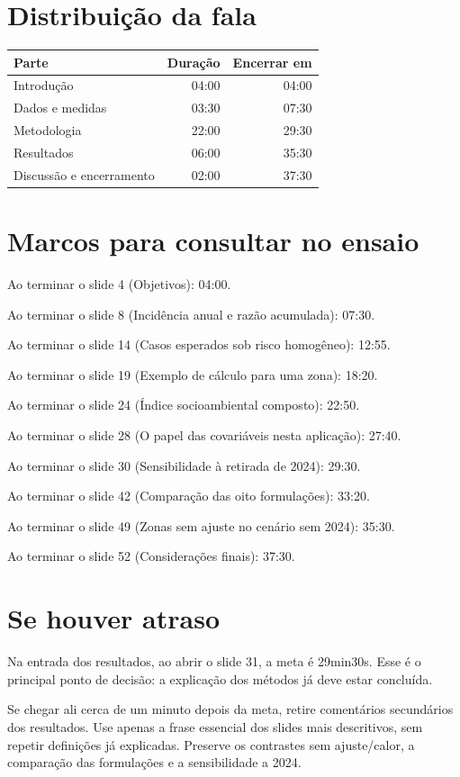 \documentclass[11pt,a4paper]{article}
\begin{document}
\section*{Distribuição da fala}\begin{tabular}{@{}lrr@{}}\toprule Parte & Duração & Encerrar em\\\midrule
Introdução & 04:00 & 04:00\\
Dados e medidas & 03:30 & 07:30\\
Metodologia & 22:00 & 29:30\\
Resultados & 06:00 & 35:30\\
Discussão e encerramento & 02:00 & 37:30\\
\bottomrule\end{tabular}
\section*{Marcos para consultar no ensaio}
Ao terminar o slide 4 (Objetivos): 04:00.\par
Ao terminar o slide 8 (Incidência anual e razão acumulada): 07:30.\par
Ao terminar o slide 14 (Casos esperados sob risco homogêneo): 12:55.\par
Ao terminar o slide 19 (Exemplo de cálculo para uma zona): 18:20.\par
Ao terminar o slide 24 (Índice socioambiental composto): 22:50.\par
Ao terminar o slide 28 (O papel das covariáveis nesta aplicação): 27:40.\par
Ao terminar o slide 30 (Sensibilidade à retirada de 2024): 29:30.\par
Ao terminar o slide 42 (Comparação das oito formulações): 33:20.\par
Ao terminar o slide 49 (Zonas sem ajuste no cenário sem 2024): 35:30.\par
Ao terminar o slide 52 (Considerações finais): 37:30.\par
\section*{Se houver atraso}
Na entrada dos resultados, ao abrir o slide 31, a meta é 29min30s. Esse é o principal ponto de decisão: a explicação dos métodos já deve estar concluída.

Se chegar ali cerca de um minuto depois da meta, retire comentários secundários dos resultados. Use apenas a frase essencial dos slides mais descritivos, sem repetir definições já explicadas. Preserve os contrastes sem ajuste/calor, a comparação das formulações e a sensibilidade a 2024.
\end{document}
